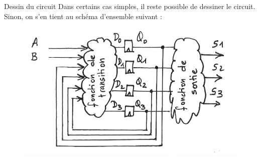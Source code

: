 \documentclass[xcolor=table]{beamer}
\begin{document}
\begin{frame}{Dessin du circuit}
Dans certains cas simples, il reste possible de dessiner le circuit. Sinon, on s'en tient
au schéma d'ensemble suivant :

\begin{figure}[!htp]
  \centering
  \includegraphics[scale=0.2]{./circuit_template.png}
\end{figure}

\end{frame}
\end{document}

